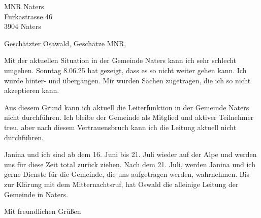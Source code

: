 \documentclass[private]{scrlttr2}
\begin{document}


\begin{letter}{
  MNR Naters \\
  Furkastrasse 46 \\
  3904 Naters
}

\opening{Geschätzter Osawald, Geschätze MNR,}

Mit der aktuellen Situation in der Gemeinde Naters kann ich sehr schlecht umgehen. Sonntag 8.06.25 hat gezeigt, dass es so nicht weiter gehen kann. Ich wurde hinter- und übergangen. Mir wurden Sachen zugetragen, die ich so nicht akzeptieren kann.

Aus diesem Grund kann ich aktuell die Leiterfunktion in der Gemeinde Naters nicht durchführen. Ich bleibe der Gemeinde als Mitglied und aktiver Teilnehmer treu, aber nach diesem Vertrauensbruch kann ich die Leitung aktuell nicht durchführen.

Janina und ich sind ab dem 16. Juni bis 21. Juli wieder auf der Alpe und werden uns für diese Zeit total zurück ziehen. Nach dem 21. Juli, werden Janina und ich gerne Dienste für die Gemeinde, die uns aufgetragen werden, wahrnehmen. Bis zur Klärung mit dem Mitternachtsruf, hat Oswald die alleinige Leitung der Gemeinde in Naters.

\closing{Mit freundlichen Grüßen}

\end{letter}
\end{document}
